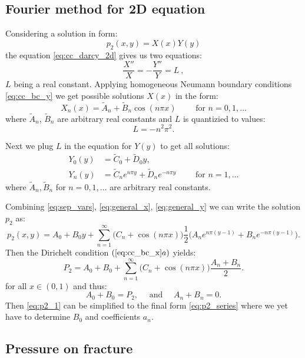 \documentclass[a4paper,10pt]{article}
\begin{document}
\subsection{\bf Fourier method for 2D equation}
\label{sec:p2_conductive}

Considering a solution in form:
\begin{equation}
    \label{eq:sep_vars}
    p_2(x,y) = X(x)Y(y) 
\end{equation}
the equation \eqref{eq:cc_darcy_2d} gives us two equations:
\[
\frac{X''}{X} = -\frac{Y''}{Y} = L\ ,
\]
$L$ being a real constant. Applying homogeneous Neumann boundary conditions \eqref{eq:cc_bc_y}
we get possible solutions $X(x)$ in the form: 
\begin{equation}
    \label{eq:general_x}
    X_n(x) = \tilde A_n + \tilde B_n \cos (n\pi x)\qquad \text{ for }n=0,1, \dots
\end{equation}
where $\tilde A_n$, $\tilde B_n$ are arbitrary real constants and $L$ is quantizied to values:
\[
    L= - n^2 \pi^2.
\]


Next we plug $L$ in the equation for $Y(y)$ to get all solutions:
\begin{align}
Y_0(y) &= \tilde C_0 + \tilde D_0 y, \nonumber \\
\label{eq:general_y}
Y_n(y) &= \tilde C_n e^{n\pi y}+ \tilde D_n e^{-n\pi y}\qquad \text{ for } n =1, \dots
\end{align}
where $\tilde A_n, \tilde B_n$ for $n=0,1,\dots$ are arbitrary real constants.

Combining \eqref{eq:sep_vars}, \eqref{eq:general_x}, \eqref{eq:general_y} we can write the solution $p_2$ as:
\begin{equation}
    \label{eq:p2_1}
    p_2(x, y) = A_0 + B_0 y + \sum ^{\infty}_{n=1} \big(C_n + \cos (n\pi x)\big) 
            \frac{1}{2}\big(A_n e^{n\pi (y-1)} + B_n e^{-n\pi (y-1)}\big).
\end{equation}
Then the Dirichelt condition $(\ref{eq:cc_bc_x}a)$ yields:
\[
    P_2 = A_0 + B_0 + \sum ^{\infty}_{n=1} \big(C_n + \cos (n\pi x)\big) 
            \frac{A_n  + B_n}{2}.
\]
for all $x\in (0, 1)$ and thus:
\[
    A_0 + B_0 = P_2, \quad\text{ and } \quad A_n+B_n = 0.
\]
Then \eqref{eq:p2_1} can be simplified to the final form \eqref{eq:p2_series} where we yet have to determine $B_0$ and coefficients $a_n$.


\subsection{Pressure on fracture}
\label{sec:p1_conductive}
\end{document}
